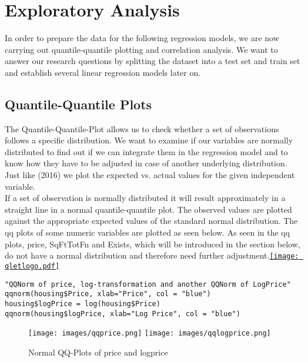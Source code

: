 
\section{Exploratory Analysis}\label{Sec:exploratory}

In order to prepare the data for the following regression models, we are now carrying out quantile-quantile plotting and correlation analysis. We want to answer our research questions by splitting the dataset into a test set and train set and establish several linear regression models later on. 


\subsection{Quantile-Quantile Plots}

The Quantile-Quantile-Plot allows us to check whether a set of observations follows a specific distribution. We want to examine if our variables are normally distributed to find out if we can integrate them in the regression model and to know how they have to be adjusted in case of another underlying distribution. Just like \citeauthor{merellking}(2016) we plot the expected vs. actual values for the given independent variable. \\ %
If a set of observation is normally distributed it will result approximately in a straight line in a normal quantile-quantile plot. The observed values are plotted against the appropriate expected values of the standard normal distribution. The qq plots of some numeric variables are plotted as seen below. As seen in the qq plots, price, SqFtTotFn and Exists, which will be introduced in the section below, do not have a normal distribution and therefore need further adjustment.\href{https://github.com/arminecseri/SPL-SOSE-17/blob/master/qqplots.R}{\texttt{[image: qletlogo.pdf]}} \\

 \begin{lstlisting}[frame = single,backgroundcolor=\color{hellgelb}]
"QQNorm of price, log-transformation and another QQNorm of LogPrice"
qqnorm(housing$Price, xlab="Price", col = "blue")
housing$logPrice = log(housing$Price)
qqnorm(housing$logPrice, xlab="Log Price", col = "blue")
\end{lstlisting}


\begin{figure}[ht]
\centering
	\texttt{[image: images/qqprice.png]}
	\texttt{[image: images/qqlogprice.png]}
	\caption{Normal QQ-Plots of price and logprice}
\label{}
\end{figure}


